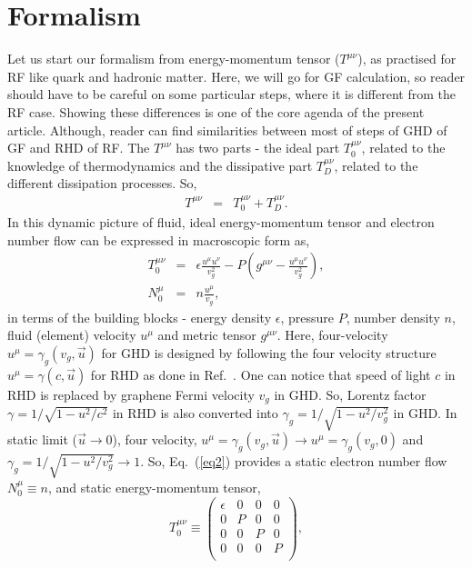 \documentclass[%
 reprint,
 amsmath,amssymb,
 aps,
]{revtex4-2}
\newcommand{\bea}{\begin{eqnarray}}
\newcommand{\eea}{\end{eqnarray}}
\newcommand{\nn}{\nonumber}
\newcommand{\ep}{\epsilon}
\begin{document}
    \section{Formalism}
    \label{sec: Form}
    Let us start our formalism from energy-momentum tensor ($T^{\mu\nu}$), as practised for RF like quark and hadronic matter. Here, we will go for GF calculation, so reader should have to be careful on some particular steps, where it is different from the RF case. Showing these differences is one of the core agenda of the present article. Although, reader can find similarities between most of steps of GHD of GF and RHD of RF. The $T^{\mu\nu}$ has two parts - the ideal part $T_0^{\mu\nu}$, related to the knowledge of thermodynamics and the dissipative part $T_D^{\mu\nu}$, related to the different dissipation processes. So,
    \bea
    T^{\mu\nu} &=& T_0^{\mu\nu} + T_D^{\mu\nu}. 
    \eea
    In this dynamic picture of fluid, ideal energy-momentum tensor and electron number flow can be expressed in macroscopic form as,
    \bea
    T_0^{\mu\nu} &=&  \ep \frac{u^\mu u^\nu}{v_g^2} - P\left(g^{\mu\nu} -\frac{u^\mu u^\nu}{v_g^2}\right),
    \nn\\
    N_0^\mu &=& n \frac{u^\mu}{v_g},
    \label{eq2}
    \eea
    in terms of the building blocks - energy density $\epsilon$, pressure $P$, number density $n$, fluid (element) velocity $u^\mu$ and metric tensor $g^{\mu \nu}$. Here, four-velocity $u^{\mu}=\gamma_g (v_g, \vec{u})$ for GHD is designed by following the four velocity structure $u^{\mu}=\gamma (c, \vec{u})$ for RHD as done in Ref.~\cite{eHD2}. One can notice that speed of light $c$ in RHD is replaced by graphene Fermi velocity $v_g$ in GHD. So, Lorentz factor $\gamma= 1/\sqrt{1-u^2/c^2}$ in RHD is also converted into $\gamma_g= 1/\sqrt{1-u^2/v_g^2}$ in GHD. In static limit (${\vec u}\rightarrow 0$), four velocity, $u^{\mu}=\gamma_g (v_g, \vec{u}) \rightarrow u^{\mu}=\gamma_g (v_g, 0)$ and $\gamma_g= 1/\sqrt{1-u^2/v_g^2} \rightarrow 1$. So, Eq.~(\ref{eq2}) provides a static electron number flow $N^\mu_0\equiv n$, and static energy-momentum tensor, 
    \begin{equation}
    T_0^{\mu\nu} \equiv  \begin{pmatrix}
    \epsilon &  0   &  0 & 0\\
     0  &   P &  0 & 0\\
     0  &  0  &  P &  0\\
     0  &  0  &  0 &  P\\
     \end{pmatrix},
%
    \end{equation}
\end{document}
